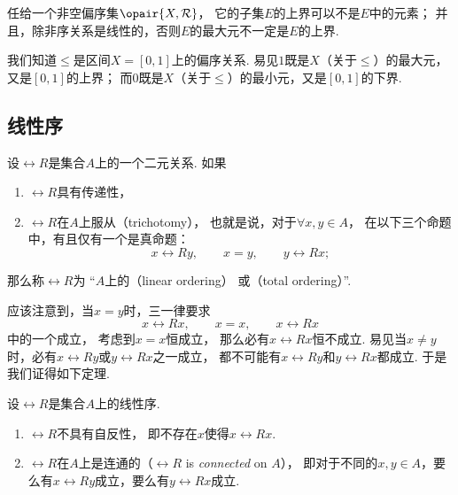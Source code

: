 任给一个非空偏序集\(\opair{X,\rel{R}}\)，
它的子集\(E\)的上界可以不是\(E\)中的元素；
并且，除非序关系是线性的，否则\(E\)的最大元不一定是\(E\)的上界.

\begin{example}
我们知道\(\leq\)是区间\(X=[0,1]\)上的偏序关系.
易见\(1\)既是\(X\)（关于\(\leq\)）的最大元，又是\([0,1]\)的上界；
而\(0\)既是\(X\)（关于\(\leq\)）的最小元，又是\([0,1]\)的下界.
\end{example}

\subsection{线性序}
\begin{definition}
设\(\rel{R}\)是集合\(A\)上的一个二元关系.
如果\begin{enumerate}
	\item \(\rel{R}\)具有传递性，
	\item \(\rel{R}\)在\(A\)上服从（trichotomy），
	也就是说，对于\(\forall x,y \in A\)，
	在以下三个命题中，有且仅有一个是真命题：\[
		x \rel{R} y, \qquad
		x = y, \qquad
		y \rel{R} x;
	\]
\end{enumerate}
那么称\(\rel{R}\)为
“\(A\)上的（linear ordering）
或（total ordering）”.
\end{definition}

应该注意到，当\(x = y\)时，三一律要求\[
	x \rel{R} x, \qquad
	x = x, \qquad
	x \rel{R} x
\]中的一个成立，
考虑到\(x = x\)恒成立，
那么必有\(x \rel{R} x\)恒不成立.
易见当\(x \neq y\)时，必有\(x \rel{R} y\)或\(y \rel{R} x\)之一成立，
都不可能有\(x \rel{R} y\)和\(y \rel{R} x\)都成立.
于是我们证得如下定理.

\begin{theorem}
设\(\rel{R}\)是集合\(A\)上的线性序.
\begin{enumerate}
	\item \(\rel{R}\)不具有自反性，
	即不存在\(x\)使得\(x \rel{R} x\).

	\item \(\rel{R}\)在\(A\)上是连通的（\(\rel{R}\) is \emph{connected} on \(A\)），
	即对于不同的\(x,y \in A\)，要么有\(x \rel{R} y\)成立，要么有\(y \rel{R} x\)成立.
\end{enumerate}
\end{theorem}

